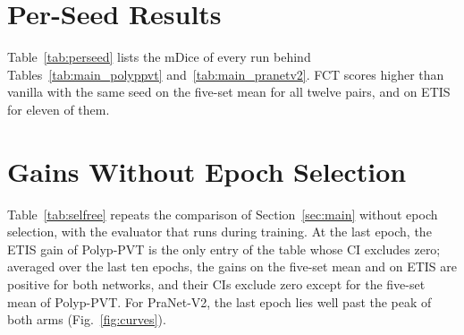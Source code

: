\appendices

\section{Per-Seed Results}
\label{app:perseed}

Table~\ref{tab:perseed} lists the mDice of every run behind Tables~\ref{tab:main_polyppvt}
and~\ref{tab:main_pranetv2}. FCT scores higher than vanilla with the same seed on the five-set mean
for all twelve pairs, and on ETIS for eleven of them.



\section{Gains Without Epoch Selection}
\label{app:selfree}

Table~\ref{tab:selfree} repeats the comparison of Section~\ref{sec:main} without epoch selection,
with the evaluator that runs during training. At the last epoch, the ETIS gain of Polyp-PVT is the only
entry of the table whose CI excludes zero; averaged over the last ten epochs, the gains on the five-set mean and on ETIS are
positive for both networks, and their CIs exclude zero except for the five-set mean of Polyp-PVT.
For PraNet-V2, the last epoch lies well past the peak of both arms (Fig.~\ref{fig:curves}).


